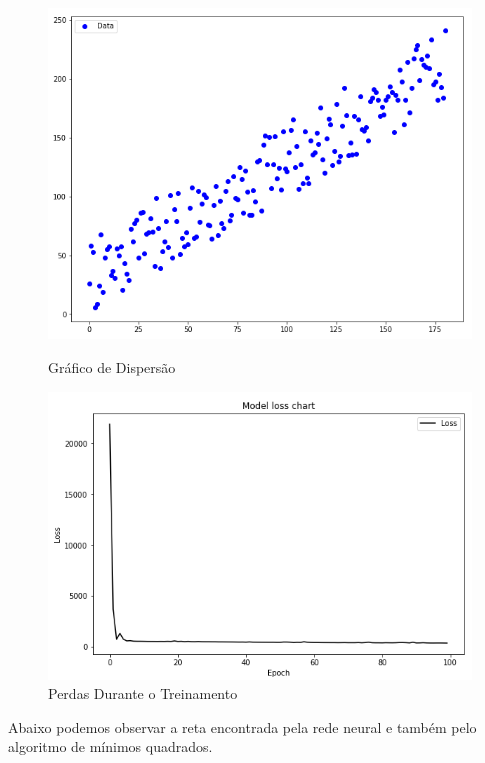 \documentclass[12pt,openright,openany,oneside,article,a4paper,brazi]{abntex2}
\begin{document}
\begin{figure}[!htb]
  \begin{minipage}[!]{0.48\linewidth}
  \includegraphics[scale=0.5]{Disperção.PNG}
  \caption{Gráfico de Dispersão}
  \label{fig:}
  \end{minipage}
  \begin{minipage}[!]{0.48\linewidth}
  \includegraphics[scale=0.6]{Perda_Regressão.PNG}
  \caption{Perdas Durante o Treinamento}
  \label{fig:}
  \end{minipage}
\end{figure}

Abaixo podemos observar a reta encontrada pela rede neural e também pelo algoritmo de mínimos quadrados. \\
\end{document}
